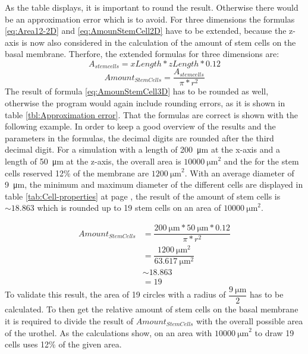 As the table displays, it is important to round the result. Otherwise there would be an approximation error which is to avoid.
\newline
For three dimensions the formulas \ref{eq:Area12-2D} and \ref{eq:AmounStemCell2D} have to be extended, because the z-axis is now also considered in the calculation of the amount of stem cells on the basal membrane. Therfore, the extended formulas for three dimensions are:
\begin{equation}\label{eq:Area12-3D}
A_{stem cells} = xLength * zLength * 0.12
\end{equation}
\begin{equation}\label{eq:AmounStemCell3D}
Amount_{StemCells} = \dfrac{A_{stem cells}}{\pi * r^{2}} 
\end{equation}
The result of formula \ref{eq:AmounStemCell3D} has to be rounded as well, otherwise the program would again include rounding errors, as it is shown in table \ref{tbl:Approximation error}. That the formulas are correct is shown with the following example. In order to keep a good overview of the results and the parameters in the formulas, the decimal digits are rounded after the third decimal digit. \newline
For a simulation with a length of \SI{200}{\micro\metre} at the x-axis and a length of \SI{50}{\micro\metre} at the z-axis, the overall area is $\SI{10000}{\micro\metre}^{2}$ and the for the stem cells reserved 12\% of the membrane are $\SI{1200}{\micro\metre}^{2}$. With an average diameter of \SI{9}{\micro\metre}, the minimum and maximum diameter of the different cells are displayed in table \ref{tab:Cell-properties} at page \pageref{tab:Cell-properties}, the result of the amount of stem cells is $\sim 18.863$ which is rounded up to 19 stem cells on an area of $\SI{10000}{\micro\metre}^{2}$.

\begin{equation}
\begin{split}
Amount_{StemCells} & = \dfrac{\SI{200}{\micro\metre} * \SI{50}{\micro\metre} * 0.12}{\pi * r^{2}} \\
					& = \dfrac{\SI{1200}{\micro\metre^{2}}}{\SI{63.617}{\micro\metre^{2}}} \\
					& \sim 18.863 \\
					& = 19
\end{split}
\end{equation}
To validate this result, the area of 19 circles with a radius of $\dfrac{\SI{9}{\micro\metre}}{2}$ has to be calculated. To then get the relative amount of stem cells on the basal membrane it is required to divide the result of $Amount_{StemCells}$ with the overall possible area of the urothel. As the calculations show, on an area with $\SI{10000}{\micro\metre}^{2}$ to draw 19 cells uses 12\% of the given area.


